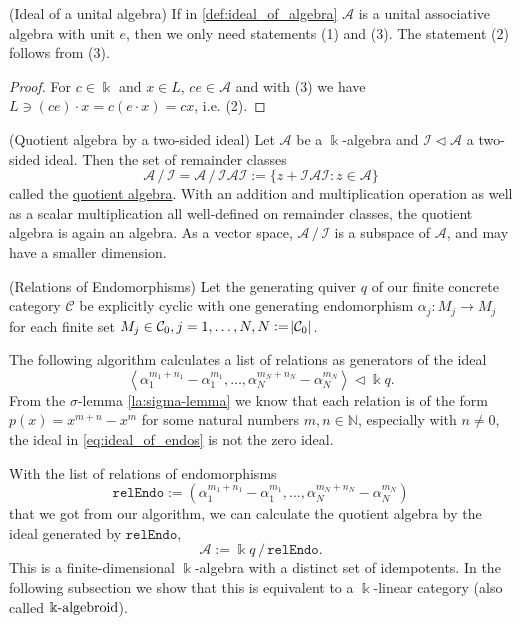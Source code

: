 \begin{remark}{(Ideal of a unital algebra)}
If in \ref{def:ideal_of_algebra} $\mathcal{A}$ is a unital associative algebra with unit $e$, then we only need statements
(1) and (3). The statement (2) follows from (3).
\end{remark}
\begin{proof}
For $c \in \Bbbk$ and $x\in L$, $ce \in \mathcal{A}$ and with (3) we have $L \ni (ce)\cdot x = c(e\cdot x) = cx$, i.e. (2).
\end{proof}

\begin{remark}{(Quotient algebra by a two-sided ideal)}
Let $\mathcal{A}$ be a $\Bbbk$-algebra and $\mathcal{I} \vartriangleleft \mathcal{A}$ a two-sided ideal. Then the set of
remainder classes 
\[
\mathcal{A}\,/\,\mathcal{I} = \mathcal{A}\,/\,\mathcal{IAI} := \{ z + \mathcal{IAI} : z\in \mathcal{A} \}
\]
called the \ul{quotient algebra}. With an addition and multiplication operation as well as a scalar multiplication all well-defined on remainder classes,
the quotient algebra is again an algebra. As a vector space, $\mathcal{A}\,/\,\mathcal{I}$ is a subspace of $\mathcal{A}$,
and may have a smaller dimension.
\end{remark}

\begin{remark}{(Relations of Endomorphisms)}
Let the generating quiver $q$ of our finite concrete category $\mathcal{C}$ be explicitly cyclic with one generating endomorphism
$\alpha_{j} : M_{j} \rightarrow M_{j}$ for each finite set $M_{j} \in \mathcal{C}_{0}, j = 1,\dots,N, N := \abs{\mathcal{C}_{0}}$.

The following algorithm calculates a list of relations as generators of the ideal
\begin{equation}
\left< \alpha_{1}^{m_{1}+n_{1}} - \alpha_{1}^{m_{1}}, \dots, \alpha_{N}^{m_{N}+n_{N}} - \alpha_{N}^{m_{N}} \right>
\vartriangleleft \label{eq:ideal_of_endos} \Bbbk q.
\end{equation}
From the $\sigma$-lemma \ref{la:sigma-lemma} we know that each relation is of the form $p(x) = x^{m+n} - x^{m}$ for some natural numbers
$m, n \in \mathbb{N}$, especially with $n \neq 0$, the ideal in \eqref{eq:ideal_of_endos} is not the zero ideal.

With the list of relations of endomorphisms
\[
\mathtt{relEndo} := ( \alpha_{1}^{m_{1}+n_{1}} - \alpha_{1}^{m_{1}}, \dots, \alpha_{N}^{m_{N}+n_{N}} - \alpha_{N}^{m_{N}} )
\]
that we got from our algorithm, we can calculate the quotient algebra by the ideal generated by $\mathtt{relEndo}$,
\[
\mathcal{A} := \Bbbk q \, / \, \mathtt{relEndo}.
\]
This is a finite-dimensional $\Bbbk$-algebra with a distinct set of idempotents.
In the following subsection we show that this is equivalent to a $\Bbbk$-linear category (also called $\Bbbk\textnormal{-}\mathrm{algebroid}$).
\end{remark}

